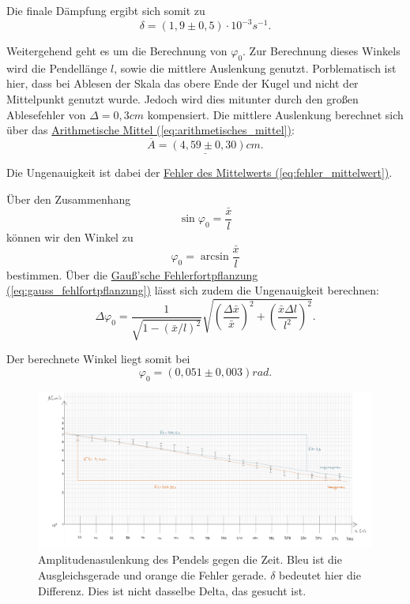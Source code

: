 Die finale Dämpfung ergibt sich somit zu 
\begin{equation}
\boxed{
    \delta = (1,9 \pm 0,5) \cdot 10^{-3} s^{-1}
}.
\end{equation}

Weitergehend geht es um die Berechnung von $\varphi_0$. Zur Berechnung dieses Winkels wird die Pendellänge $l$, sowie die mittlere Auslenkung genutzt. Porblematisch ist hier, dass bei Ablesen der Skala das obere Ende der Kugel und nicht der Mittelpunkt genutzt wurde. Jedoch wird dies mitunter durch den großen Ablesefehler von $\Delta = 0,3cm$ kompensiert. Die mittlere Auslenkung berechnet sich über das \hyperref[eq:arithmetisches_mittel]{Arithmetische Mittel (\ref*{eq:arithmetisches_mittel})}:
\begin{equation}
    \underline{
        \overline{A} = (4,59 \pm 0,30) cm.
    }
\end{equation}

Die Ungenauigkeit ist dabei der \hyperref[eq:fehler_mittelwert]{Fehler des Mittelwerts (\ref*{eq:fehler_mittelwert})}.

Über den Zusammenhang
\begin{equation}
\sin \varphi_0 = \frac{\bar x}{l}
\end{equation}
können wir den Winkel zu
\begin{equation}
    \varphi_0 = \arcsin \frac{\bar x}{l} 
\end{equation}
bestimmen. 
Über die \hyperref[eq:gauss_fehlfortpflanzung]{Gauß'sche Fehlerfortpflanzung (\ref*{eq:gauss_fehlfortpflanzung})} lässt sich zudem die Ungenauigkeit berechnen:
\begin{equation}
    \Delta \varphi_0 = \frac{1}{\sqrt{1 - (\bar x/l)^2}} \sqrt{{\left(\frac{\Delta \bar x}{\bar x}\right)^2 + \left(\frac{\bar x\Delta l}{l^2}\right)^2}}.
\end{equation}

Der berechnete Winkel liegt somit bei
\begin{equation}
    \boxed{
        \varphi_0 = (0,051 \pm 0,003) rad
    }.
\end{equation}

\onecolumn
\begin{figure}
    \hspace*{-2.4cm}
    \centering
    \includegraphics[width=1.3\textwidth]{img/14/BetterPlot.pdf}
    \caption{Amplitudenasulenkung des Pendels gegen die Zeit. Bleu ist die Ausgleichsgerade und orange die Fehler gerade. $\delta$ bedeutet hier die Differenz. Dies ist nicht dasselbe Delta, das gesucht ist.}
    \label{fig:plot} 
\end{figure}
\twocolumn

